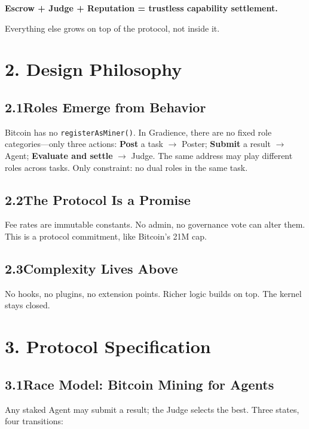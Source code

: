\documentclass[11pt,a4paper]{article}
\begin{document}
\begin{center}\textbf{Escrow + Judge + Reputation = trustless capability settlement.}\end{center}

Everything else grows on top of the protocol, not inside it.

\section{2. Design Philosophy}

\subsection{2.1\quad Roles Emerge from Behavior}
Bitcoin has no \texttt{registerAsMiner()}. In Gradience, there are no fixed role categories---only three actions: \textbf{Post} a task $\rightarrow$ Poster; \textbf{Submit} a result $\rightarrow$ Agent; \textbf{Evaluate and settle} $\rightarrow$ Judge. The same address may play different roles across tasks. Only constraint: no dual roles in the same task.

\subsection{2.2\quad The Protocol Is a Promise}
Fee rates are immutable constants. No admin, no governance vote can alter them. This is a protocol commitment, like Bitcoin's 21M cap.

\subsection{2.3\quad Complexity Lives Above}
No hooks, no plugins, no extension points. Richer logic builds on top. The kernel stays closed.

\section{3. Protocol Specification}

\subsection{3.1\quad Race Model: Bitcoin Mining for Agents}

Any staked Agent may submit a result; the Judge selects the best. Three states, four transitions:
\end{document}
